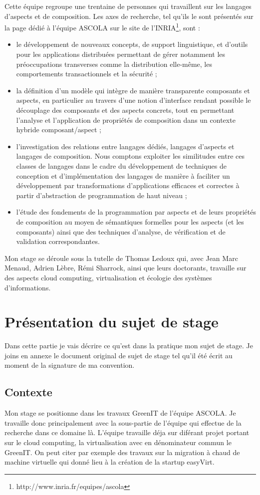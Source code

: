 \documentclass[a4paper, 11pt]{report}
\begin{document}
Cette équipe regroupe une trentaine de personnes qui travaillent sur les langages d'aspects et de composition. Les axes de recherche, tel qu'ils le sont présentés sur la page dédié à l'équipe ASCOLA sur le site de l'INRIA\footnote{http://www.inria.fr/equipes/ascola}, sont :
\begin{itemize}
	\item le développement de nouveaux concepts, de support linguistique, et d'outils pour les applications distribuées permettant de gérer notamment les préoccupations transverses comme la distribution elle-même, les comportements transactionnels et la sécurité ;
	\item la définition d'un modèle qui intègre de manière transparente composants et aspects, en particulier au travers d'une notion d'interface rendant possible le découplage des composants et des aspects concrets, tout en permettant l'analyse et l'application de propriétés de composition dans un contexte hybride composant/aspect ;
	\item l'investigation des relations entre langages dédiés, langages d'aspects et langages de composition. Nous comptons exploiter les similitudes entre ces classes de langages dans le cadre du développement de techniques de conception et d'implémentation des langages de manière à faciliter un développement par transformations d'applications efficaces et correctes à partir d'abstraction de programmation de haut niveau ;
	\item l'étude des fondements de la programmation par aspects et de leurs propriétés de composition au moyen de sémantiques formelles pour les aspects (et les composants) ainsi que des techniques d'analyse, de vérification et de validation correspondantes.
\end{itemize}

Mon stage se déroule sous la tutelle de Thomas Ledoux qui, avec Jean Marc Menaud, Adrien Lèbre, Rémi Sharrock, ainsi que leurs doctorants, travaille sur des aspects cloud computing, virtualisation et écologie des systèmes d'informations.

	\section{Présentation du sujet de stage}
Dans cette partie je vais décrire ce qu'est dans la pratique mon sujet de stage. Je joins en annexe le document original de sujet de stage tel qu'il été écrit au moment de la signature de ma convention.

		\subsection{Contexte}
Mon stage se positionne dans les travaux GreenIT de l’équipe ASCOLA. Je travaille donc principalement avec la sous-partie de l'équipe qui effectue de la recherche dans ce domaine là. L'équipe travaille déja sur diférant projet portant sur le cloud computing, la virtualisation avec en dénominateur commun le GreenIT. On peut citer par exemple des travaux sur la migration à chaud de machine virtuelle qui donné lieu à la création de la startup easyVirt.
\end{document}
